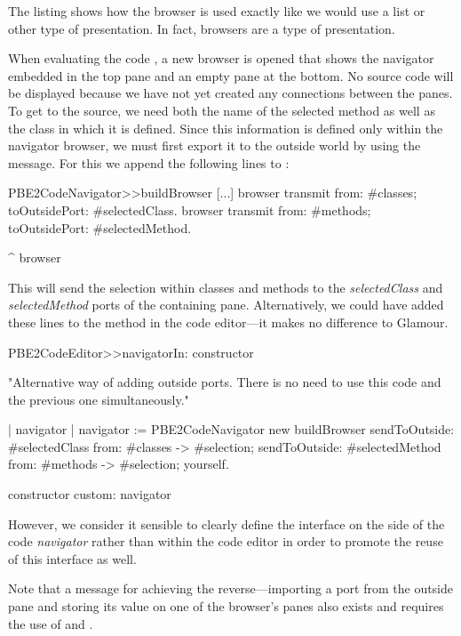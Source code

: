 \documentclass[a4paper,10pt,twoside]{book}
\begin{document}
The listing shows how the browser is used exactly like we would use a
list or other type of presentation. In fact, browsers are a type of
presentation.

When evaluating the code , a new browser is
opened that shows the navigator embedded in the top pane and an empty
pane at the bottom. No source code will be displayed because we have
not yet created any connections between the panes. To get to the
source, we need both the name of the selected method as well as the
class in which it is defined. Since this information is defined only
within the navigator browser, we must first export it to the outside
world by using the  message. For this we
append the following lines to :

\begin{code}{}
PBE2CodeNavigator>>buildBrowser
  [...]
  browser transmit from: #classes; toOutsidePort:  #selectedClass. 
  browser transmit from: #methods; toOutsidePort:  #selectedMethod.
  
  ^ browser
\end{code}

This will send the selection within classes and methods to the
\emph{selectedClass} and \emph{selectedMethod} ports of the containing
pane. Alternatively, we could have added these lines to the
 method in the code editor---it makes no difference
to Glamour.

\begin{code}{}
PBE2CodeEditor>>navigatorIn: constructor

  "Alternative way of adding outside ports. There is no need to use this
   code and the previous one simultaneously."

  | navigator |
  navigator := PBE2CodeNavigator new buildBrowser
          sendToOutside: #selectedClass from: #classes -> #selection;
          sendToOutside: #selectedMethod from: #methods -> #selection;
          yourself.
  
  constructor custom: navigator
\end{code}

However, we consider it sensible to clearly define the interface on
the side of the code \emph{navigator} rather than within the code
editor in order to promote the reuse of this interface as well.

Note that a message for achieving the reverse---importing a port from
the outside pane and storing its value on one of the browser's panes
also exists and requires the use of  and .
\end{document}
